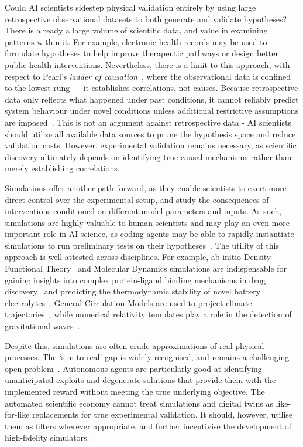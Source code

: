 \documentclass[11pt, a4paper, twocolumn, goog]{google}
\begin{document}
Could AI scientists sidestep physical validation entirely by using large retrospective observational datasets to both generate and validate hypotheses? There is already a large volume of scientific data, and value in examining patterns within it. For example, electronic health records may be used to formulate hypotheses to help improve therapeutic pathways or design better public health interventions. Nevertheless, there is a limit to this approach, with respect to Pearl's \emph{ladder of causation}~\citep{pearl2018book}, where the observational data is confined to the lowest rung — it establishes correlations, not causes. Because retrospective data only reflects what happened under past conditions, it cannot reliably predict system behaviour under novel conditions unless additional restrictive assumptions are imposed~\citep{peters2017elements, scholkopf2021toward, bareinboim2022pearl}. This is not an argument against retrospective data - AI scientists should utilise all available data sources to prune the hypothesis space and reduce validation costs. However, experimental validation remains necessary, as scientific discovery ultimately depends on identifying true causal mechanisms rather than merely establishing correlations.

Simulations offer another path forward, as they enable scientists to exert more direct control over the experimental setup, and study the consequences of interventions conditioned on different model parameters and inputs. As such, simulations are highly valuable to human scientists and may play an even more important role in AI science, as coding agents may be able to rapidly instantiate simulations to run preliminary tests on their hypotheses~\citep{boiko2023emergent,tian2024scicode, duston2025ainsteinbenchbenchmarkingcodingagents, cao2026simulcost}. The utility of this approach is well attested across disciplines. For example, ab initio Density Functional Theory~\citep{fattebert2002density} and Molecular Dynamics simulations are indispensable for gaining insights into complex protein-ligand binding mechanisms in drug discovery~\citep{hollingsworth2018molecular} and predicting the thermodynamic stability of novel battery electrolytes~\citep{jain2013commentary, oganov2019structure}. General Circulation Models are used to project climate trajectories~\citep{alizadeh2022advances}, while numerical relativity templates play a role in the detection of gravitational waves~\citep{abbott2016observation}.

Despite this, simulations are often crude approximations of real physical processes. The `sim-to-real' gap is widely recognised, and remains a challenging open problem~\citep{huang2023wentwrongclosingsimtoreal, rothfuss2024bridgingsimtorealgapbayesian, abouchakra2025realissimbridgingsimtorealgap}. Autonomous agents are particularly good at identifying unanticipated exploits and degenerate solutions that provide them with the implemented reward without meeting the true underlying objective. The automated scientific economy cannot treat simulations and digital twins as like-for-like replacements for true experimental validation. It should, however, utilise them as filters wherever appropriate, and further incentivise the development of high-fidelity simulators.
\end{document}
